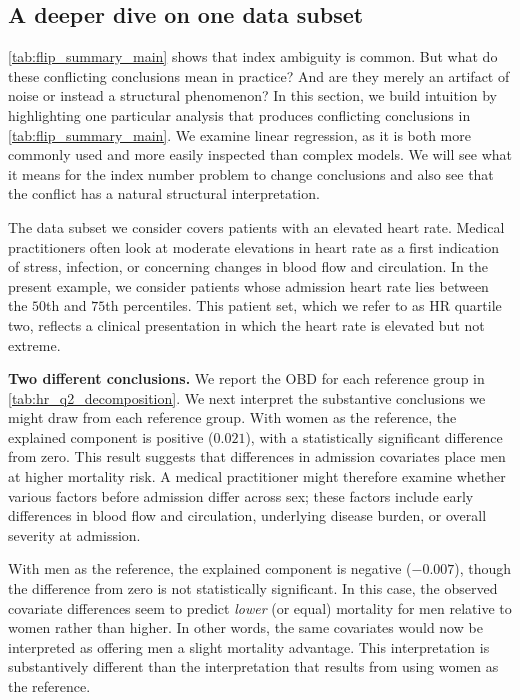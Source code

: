 \subsection{A deeper dive on one data subset}

\cref{tab:flip_summary_main} shows that index ambiguity is common.
But what do these conflicting conclusions mean in practice?
And are they merely an artifact of noise or instead a structural phenomenon?
In this section, we build intuition by highlighting one particular analysis that produces conflicting conclusions in \cref{tab:flip_summary_main}.
We examine linear regression, as it is both more commonly used and more easily inspected than complex models.
We will see what it means for the index number problem to change conclusions and also see that the conflict has a natural structural interpretation.

The data subset we consider covers patients with an elevated heart rate.
Medical practitioners often look at moderate elevations in heart rate as a first indication of stress, infection, or concerning changes in blood flow and circulation. In the present example, we consider patients whose admission heart rate lies between the $50$th and $75$th percentiles. This patient set, which we refer to as HR quartile two, reflects a clinical presentation in which the heart rate is elevated but not extreme.

\textbf{Two different conclusions.} 
We report the OBD for each reference group in \cref{tab:hr_q2_decomposition}. We next interpret the substantive conclusions
we might draw from each reference group. 
With women as the reference, the explained component is positive ($0.021$), with a statistically significant difference from zero.
This result suggests that differences in admission covariates place men at higher mortality risk. 
A medical practitioner might therefore examine whether various factors before admission differ across sex; these factors include early differences in blood flow and circulation, underlying disease burden, or overall severity at admission.

With men as the reference, the explained component is negative ($-0.007$), though the difference from zero is not statistically significant. In this case, the observed covariate differences seem to predict \emph{lower} (or equal) mortality for men relative to women rather than higher. In other words, the same covariates would now be interpreted as offering men a slight mortality advantage. This interpretation is substantively different than the interpretation that results from using women as the reference.

